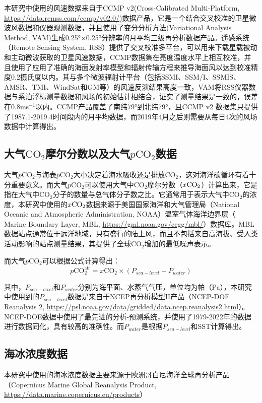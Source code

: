 本研究中使用的风速数据来自于CCMP v2(Cross-Calibrated Multi-Platform, \url{https://data.remss.com/ccmp/v02.0/})数据产品，它是一个结合交叉校准的卫星微波风数据和仪器观测数据，并且使用了变分分析方法(Variational Analysis Method, VAM)生成0.25°×0.25°分辨率的月平均三级再分析数据产品。遥感系统（Remote Sensing System, RSS）提供了交叉校准多平台，可以用来下载星载被动和主动微波获取的卫星风速数据，CCMP数据集在亮度温度水平上相互校准，并且使用了应用了准确的海面发射率模型和辐射传输方程来推导海面风以达到校准精度0.2摄氏度以内。其与多个微波辐射计平台（包括SSMI、SSM/I、SSMIS、AMSR、TMI、WindSat和GM等）的风速反演结果高度一致，VAM将RSS仪器数据与系泊浮标测量数据和风场的初始估计相结合，证实了测量结果是一致的，误差在0.8ms$^{-1}$以内。CCMP产品覆盖了南纬79°到北纬79°，且CCMP v2 数据集只提供了1987.1-2019.4时间段内的月平均数据，而2019年4月之后则需要从每日4次的风场数据中计算得出。

\subsection{大气\texorpdfstring{$\mathrm{CO_2}$}{}摩尔分数以及大气\texorpdfstring{$p\mathrm{CO_2}$}{}数据}
大气$p\mathrm{CO_2}$与海表$p\mathrm{CO_2}$大小决定着海水吸收还是排放$\mathrm{CO_2}$，这对海洋碳循环有着十分重要意义。而大气$p\mathrm{CO_2}$可以使用大气中$\mathrm{CO_2}$摩尔分数（$x\rm CO_2$）计算出来，它是指在大气中$\mathrm{CO_2}$分子的数量与总气体分子数之比。它通常用于表示大气中$\mathrm{CO_2}$的浓度，本研究中使用的$x\rm CO_2$数据来源于美国国家海洋和大气管理局（National Oceanic and Atmospheric Administration, NOAA）温室气体海洋边界层（ Marine Boundary Layer, MBL, \url{https://gml.noaa.gov/ccgg/mbl/}）数据库。MBL数据站点通常位于远洋地域，只有盛行的陆上风，而且不包括来自高海拔、受人类活动影响的站点测量结果，其提供了全球$\mathrm{CO_2}$增加的最低噪声表示。

而大气$p\mathrm{CO_2}$可以根据公式计算得出：
$$
p\mathrm{CO_2^{air}} =x\mathrm{CO_2}\times (P_{sea-level}-P_{water}) 
$$

其中，$P_{sea-level}$和$P_{water}$分别为海平面、水蒸气气压，单位均为帕（Pa），本研究中使用到的$P_{sea-level}$数据是来自于NCEP再分析模型II产品（NCEP-DOE Reanalysis 2, \url{https://psl.noaa.gov/data/gridded/data.ncep.reanalysis2.html}）。NCEP-DOE数据中使用了最先进的分析-预测系统，并使用了1979-2022年的数据进行数据同化，具有较高的准确性。而$P_{water}$是根据$P_{sea-level}$和SST计算得出。

\subsection{海冰浓度数据}
本研究中使用的海冰浓度数据主要来源于欧洲哥白尼海洋全球再分析产品（Copernicus Marine Global Reanalysis Product, \url{https://data.marine.copernicus.eu/products}）
